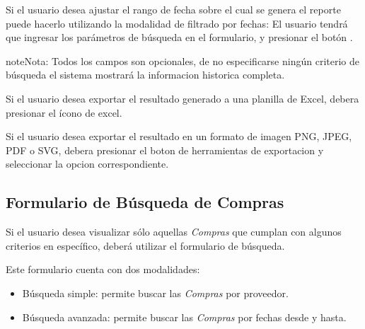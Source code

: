 \documentclass[a4paper,10pt,spanish]{sphinxmanual}
\begin{document}
Si el usuario desea ajustar el rango de fecha sobre el cual se genera el reporte puede hacerlo utilizando la modalidad de filtrado por fechas:
El usuario tendrá que ingresar los parámetros de búsqueda en el formulario, y presionar el botón .

\begin{notice}{note}{Nota:}
Todos los campos son opcionales, de no especificarse ningún criterio de búsqueda el sistema mostrará la informacion historica completa.
\end{notice}


Si el usuario desea exportar el resultado generado a una planilla de Excel, debera presionar el ícono de excel.


Si el usuario desea exportar el resultado en un formato de imagen PNG, JPEG, PDF o SVG, debera presionar el boton de herramientas de exportacion y seleccionar la opcion correspondiente.



\subsection{Formulario de Búsqueda de Compras}
\label{compras:formulario-busqueda-ventas}\label{compras:formulario-de-busqueda-de-compras}
Si el usuario desea visualizar sólo aquellas \emph{Compras} que cumplan con algunos criterios en específico, deberá utilizar el formulario de búsqueda.


Este formulario cuenta con dos modalidades:
\begin{itemize}
\item {} 
Búsqueda simple: permite buscar las \emph{Compras} por proveedor.

\item {} 
Búsqueda avanzada: permite buscar las \emph{Compras} por fechas desde y hasta.

\end{itemize}
\end{document}
